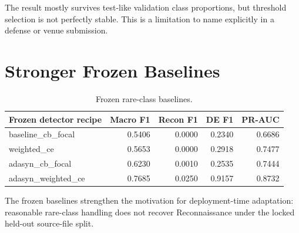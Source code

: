 \documentclass[10pt]{article}
\begin{document}
The result mostly survives test-like validation class proportions, but threshold selection is not perfectly stable.
This is a limitation to name explicitly in a defense or venue submission.

\section{Stronger Frozen Baselines}

\begin{table}[htbp]
  \centering
  \caption{Frozen rare-class baselines.}
  \label{tab:frozen-baselines}
  \small
  \setlength{\tabcolsep}{5pt}
  \begin{tabular}{lrrrr}
    \toprule
    Frozen detector recipe & Macro F1 & Recon F1 & DE F1 & PR-AUC \\
    \midrule
    baseline\_cb\_focal & 0.5406 & 0.0000 & 0.2340 & 0.6686 \\
    weighted\_ce & 0.5653 & 0.0000 & 0.2918 & 0.7477 \\
    adasyn\_cb\_focal & 0.6230 & 0.0010 & 0.2535 & 0.7444 \\
    adasyn\_weighted\_ce & 0.7685 & 0.0250 & 0.9157 & 0.8732 \\
    \bottomrule
  \end{tabular}
\end{table}

The frozen baselines strengthen the motivation for deployment-time adaptation: reasonable rare-class handling does not recover Reconnaissance under the locked held-out source-file split.

\ifdefined\praxiswrapper
\else


\end{document}
